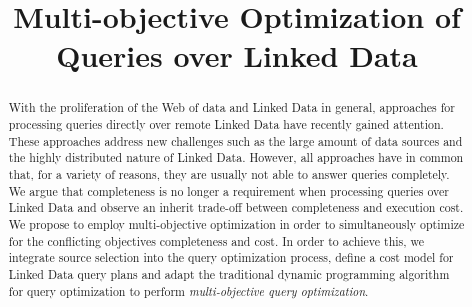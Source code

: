 \documentclass{sig-alternate}
\title{Multi-objective Optimization of Queries over Linked Data}
\author{
}
\begin{document}
\maketitle
\begin{abstract} 
  With the proliferation of the Web of data and Linked Data in
  general, approaches for processing queries directly over remote
  Linked Data have recently gained attention. These approaches address
  new challenges such as the large amount of data sources and the
  highly distributed nature of Linked Data. However, all approaches
  have in common that, for a variety of reasons, they are usually not
  able to answer queries completely. We argue that completeness is no
  longer a requirement when processing queries over Linked Data and
  observe an inherit trade-off between completeness and execution
  cost. We propose to employ multi-objective optimization in order to
  simultaneously optimize for the conflicting objectives completeness
  and cost. In order to achieve this, we integrate source selection
  into the query optimization process, define a cost model for Linked
  Data query plans and adapt the traditional dynamic programming
  algorithm for query optimization to perform \emph{multi-objective
    query optimization}. 

\end{abstract}





%








\end{document}
